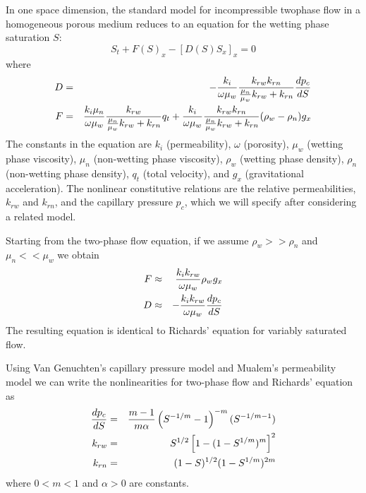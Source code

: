 \documentclass[10pt,dvips,twoside,reqno]{amsart}
\begin{document}
 In one space
dimension, the standard model for incompressible twophase flow in a homogeneous
porous medium reduces to an equation for the wetting phase saturation
$S$:
\begin{equation}
  \label{eq:buckleyLeverett}
  S_t + F(S)_x  - [D(S) S_x]_x  = 0 
\end{equation}
where
\begin{eqnarray}
  \label{eq:buckleyLeverettCoeff}
  D &=& -\frac{k_i}{\omega \mu_w} \frac{k_{rw} k_{rn}}{\frac{\mu_n}{\mu_w} k_{rw} + k_{rn}}  \frac{d {p_c}}{d {S}}\\
F &=& \frac{k_i \mu_n}{\omega \mu_w} \frac{k_{rw}}{\frac{\mu_n}{\mu_w} k_{rw} + k_{rn}} q_t +\frac{k_i}{\omega \mu_w} \frac{k_{rw} k_{rn}}{\frac{\mu_n}{\mu_w} k_{rw} + k_{rn}}(\rho_w - \rho_n) g_x 
\end{eqnarray}
The constants in the equation are $k_i$ (permeability), $\omega$
(porosity), $\mu_w$ (wetting phase viscosity), $\mu_n$ (non-wetting
phase viscosity), $\rho_w$ (wetting phase density), $\rho_n$
(non-wetting phase density), $q_t$ (total velocity), and $g_x$
(gravitational acceleration). The nonlinear constitutive relations are the relative permeabilities, $k_{rw}$ and $k_{rn}$, and the capillary pressure $p_c$, which we will specify after considering a related model. 

 Starting from the two-phase flow equation, if we assume $\rho_w >> \rho_n$ and $\mu_n << \mu_w$ we obtain
\begin{eqnarray}
F &\approx& \frac{k_i k_{rw}}{\omega \mu_w} \rho_w  g_x \\
D &\approx& -\frac{k_i k_{rw}}{\omega \mu_w} \frac{d {p_c}}{d {S}} 
\end{eqnarray}
The resulting equation is identical to Richards' equation for variably saturated flow.

 Using Van Genuchten's capillary pressure model and Mualem's permeability
model we can write the nonlinearities for two-phase flow and Richards' equation as 
\begin{eqnarray}
\frac{d {p_c}}{d {S}} &=& \frac{m-1}{m \alpha}\left( S^{-1/m} - 1 \right)^{-m}(S^{-1/m - 1}) \\
k_{rw} &=& S^{1/2} \left[ 1-(1-S^{1/m})^m \right]^2 \\
k_{rn} &=& (1-S)^{1/2}(1-S^{1/m})^{2m}
\end{eqnarray}
where $0<m<1$ and $\alpha>0$ are constants.  
\end{document}
